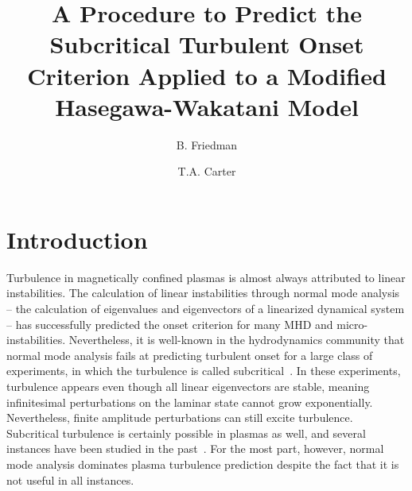 \documentclass[letter,scriptaddress,twocolumn, prl,showkeys]{revtex4}
\begin{document}
\title{A Procedure to Predict the Subcritical Turbulent Onset Criterion Applied to a Modified Hasegawa-Wakatani Model}

\author{B. Friedman}

\author{T.A. Carter}




\begin{abstract}

\end{abstract}

\maketitle

\section{Introduction}

Turbulence in magnetically confined plasmas is almost always attributed to linear instabilities. The calculation of linear instabilities through normal mode analysis
-- the calculation of eigenvalues and eigenvectors of a linearized dynamical system -- has successfully predicted the onset criterion for many MHD and micro-instabilities.
Nevertheless, it is well-known in the hydrodynamics community that normal mode analysis fails at predicting turbulent onset for a large class of experiments, in which the
turbulence is called subcritical~\cite{drazin1981}. 
In these experiments, turbulence appears even though all linear eigenvectors are stable, meaning infinitesimal perturbations on the laminar state cannot grow exponentially. 
Nevertheless, finite amplitude perturbations can still excite turbulence.
Subcritical turbulence is certainly possible in plasmas as well, and several instances have been studied in the 
past~\cite{waltz1985,scott1990,nordman1993,biskamp1995,drake1995,itoh1996,camargo1998,krommes1999,camporeale2009,schekochihin2012,highcock2012}. 
For the most part, however, normal mode analysis dominates plasma turbulence prediction despite the fact that it is not useful in all instances.
\end{document}
